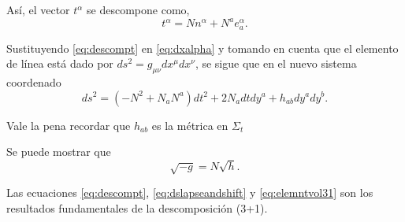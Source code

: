 \begin{center}
\end{center}

As\'{i}, el vector $t^{\alpha}$ se descompone como,
%
\begin{equation}
\label{eq:descompt}
t^{\alpha} = N n^{\alpha} + N^{a} e^{\alpha}_{a}.
\end{equation}

Sustituyendo \eqref{eq:descompt} en \eqref{eq:dxalpha} y tomando en cuenta que el elemento de l\'{i}nea est\'{a} dado por $ds^{2} = g_{\mu \nu} d x^{\mu} d x^{\nu}$, se sigue que en el nuevo sistema coordenado
%
\begin{equation}
\label{eq:dslapseandshift}
ds^{2} = (-N^{2} + N_{a} N^{a}) dt^{2} + 2 N_{a} dt dy^{a} + h_{ab} dy^{a} dy^{b}.
\end{equation}

%
%

Vale la pena recordar que $h_{ab}$ es la m\'{e}trica en $\Sigma_{t}$

Se puede mostrar que
%
\begin{equation}
\label{eq:elemntvol31}
\sqrt{-g} = N \sqrt{h}.
\end{equation}

Las ecuaciones \eqref{eq:descompt}, \eqref{eq:dslapseandshift} y \eqref{eq:elemntvol31} son los resultados fundamentales de la descomposici\'{o}n (3+1).
